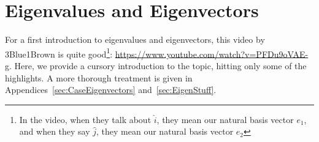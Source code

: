 




\section{Eigenvalues and Eigenvectors}

For a first introduction to eigenvalues and eigenvectors, this video by 3Blue1Brown is quite good\footnote{In the video, when they talk about $\hat{i}$, they mean our natural basis vector $e_1$, and when they say $\hat{j}$, they mean our natural basis vector $e_2$ }: \url{https://www.youtube.com/watch?v=PFDu9oVAE-g}. Here, we provide a cursory introduction to the topic, hitting only some of the highlights. A more thorough treatment is given in Appendices~\ref{sec:CaseEigenvectors} and~\ref{sec:EigenStuff}. \\

